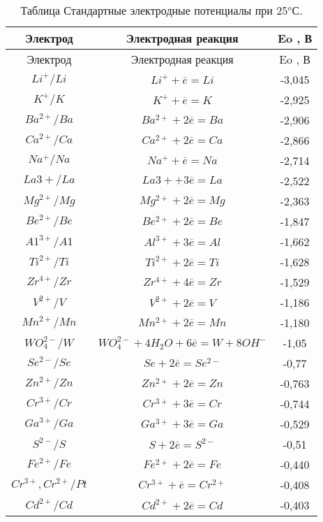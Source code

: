 \begin{longtable}[h]{|c|c|c|}
\caption{Таблица Стандартные электродные потенциалы при 25$^{o}$С.}\\
\hline
Электрод & Электродная реакция & Eo , В\\
\hline\endfirsthead
\hline
Электрод & Электродная реакция & Eo , В\\
\endhead
$Li^{+}/Li$ & $Li^{+} +\overline{e} = Li$ & -3,045\\
\hline
$K^{+}/K$ & $K^{+}+ \overline{e} = K$ & -2,925\\
\hline
$Ba^{2+}/Ba$ & $Ba^{2+} + 2\overline{e} = Ba$ & -2,906\\
\hline
$Ca^{2+}/Ca$ & $Ca^{2+} + 2\overline{e} = Ca$ & -2,866\\
\hline
$Na^{+}/Na$ & $Na^{+} + \overline{e} = Na$ & -2,714\\
\hline
$La3+/La$ & $La3+ + 3\overline{e} = La$ & -2,522\\
\hline
$Mg^{2+}/Mg$ & $Mg^{2+} + 2\overline{e} = Mg$ & -2,363\\
\hline
$Be^{2+}/Be$ & $Be^{2+} + 2\overline{e} = Be$ & -1,847\\
\hline
$A1^{3+}/A1$ & $Al^{3+} + 3\overline{e} = Al$ & -1,662\\
\hline
$Ti^{2+}/Ti$ & $Ti^{2+} + 2\overline{e} = Ti$ & -1,628\\
\hline
$Zr^{4+}/Zr$ & $Zr^{4+} + 4\overline{e} = Zr$ & -1,529\\
\hline
$V^{2+}/V$ & $V^{2+} + 2\overline{e} = V$ & -1,186\\
\hline
$Mn^{2+}/Mn$ & $Mn^{2+} + 2\overline{e} = Mn$ & -1,180\\
\hline
$WO_{4}^{2-}/W$ & $WO_{4}^{2-} + 4H_{2}O + 6\overline{e} = W + 8OH^{-}$ & -1,05\\
\hline
$Se^{2-}/Se$ & $Se + 2\overline{e} = Se^{2-}$ & -0,77\\
\hline
$Zn^{2+}/Zn$ & $Zn^{2+} + 2\overline{e} = Zn$ & -0,763\\
\hline
$Cr^{3+}/Cr$ & $Cr^{3+} + 3\overline{e} = Cr$ & -0,744\\
\hline
$Ga^{3+}/Ga$ & $Ga^{3+} + 3\overline{e} = Ga$ & -0,529\\
\hline
$S^{2-}/S$ & $S + 2\overline{e} = S^{2-}$ & -0,51\\
\hline
$Fe^{2+}/Fe$ & $Fe^{2+} + 2\overline{e} = Fe$ & -0,440\\
\hline
$Cr^{3+},Cr^{2+}/Pt$ & $Cr^{3+} + \overline{e} = Cr^{2+}$ & -0,408\\
\hline
$Cd^{2+}/Cd$ & $Cd^{2+} + 2\overline{e} = Cd$ & -0,403\\

\end{longtable}
